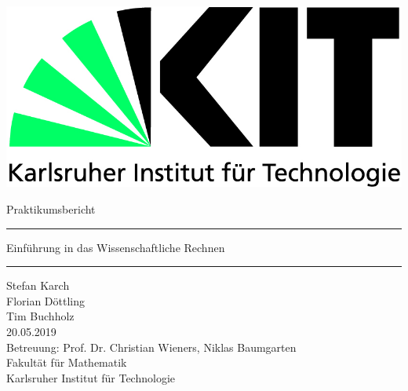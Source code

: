 \begin{titlepage}
	\includegraphics[scale=0.5]{kit-logo.jpg} 
	\begin{center} 
		\LARGE 
		\vspace*{2cm}
		\LARGE Praktikumsbericht \BerichtNR
		\vspace*{1.0cm}
		\hrule
		\vspace*{0.2cm}
		{\vspace{0.2cm} \huge Einführung in das Wissenschaftliche Rechnen}\vspace{0.5cm}
		\hrule
		\vspace*{2.5cm}
		\Large Stefan Karch \\
		Florian Döttling \\
		Tim Buchholz  \\
		\vspace*{1cm}
		20.05.2019 \\
		\vspace*{1.5cm}
		\vspace*{4.0cm}
		\Large Betreuung: Prof. Dr. Christian Wieners, Niklas Baumgarten \\[0.5cm]
		\Large Fakultät für Mathematik \\
		\Large Karlsruher Institut für Technologie
	\end{center}
\end{titlepage}
